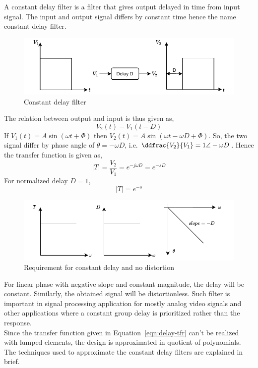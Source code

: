 A constant delay filter is a filter that gives output delayed in time from input signal. The input and output signal differs by constant time hence the name constant delay filter.
\begin{figure}[H]
    \centering
    \includegraphics{../Figures/delay.pdf}
    \caption{Constant delay filter}
    \label{fig:const-delay}
\end{figure}
The relation between output and input  is thus given as,
\begin{equation*}
        V_2(t)-V_1(t-D)
\end{equation*}
If $V_1(t)=A\sin(\omega t + \Phi)$ then  $V_2(t)=A\sin(\omega t -\omega D + \Phi)$. So, the two signal differ by phase angle of $\theta=-\omega D$, i.e. $\ddfrac{V_2}{V_1}=1\angle -\omega D$. Hence the transfer function is given as,
\begin{equation*}
    |T|=\frac{V_2}{V_1}=e^{-j\omega D}=e^{-sD}
\end{equation*}
For normalized delay $D=1$, 
\begin{equation}
    |T|=e^{-s}
    \label{eqn:delay-tfr}
\end{equation}
\begin{figure}[H]
    \centering
    \includegraphics{../Figures/delay_plot.pdf}
    \caption{Requirement for constant delay and no distortion}
    \label{fig:const-delay-plot}
\end{figure}
For linear phase with negative slope and constant magnitude, the delay will be constant. Similarly, the obtained signal will be distortionless. Such filter is important in signal processing application for mostly analog video signals and other applications where a constant group delay is prioritized rather than the response.\\
Since the transfer function given in Equation~\ref{eqn:delay-tfr} can't be realized with lumped elements, the design is approximated in quotient of polynomials. The techniques used to approximate the constant delay filters are explained in brief.
